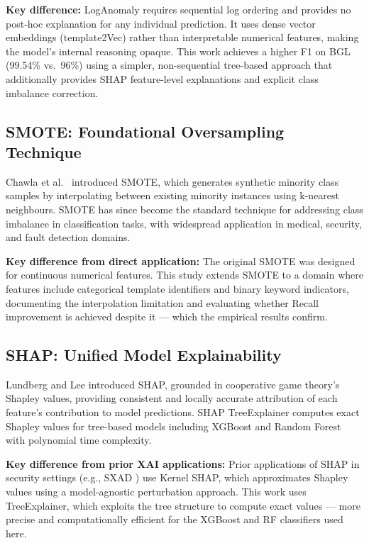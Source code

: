 \documentclass[conference]{IEEEtran}
\begin{document}
\textbf{Key difference:} LogAnomaly requires sequential log ordering and
provides no post-hoc explanation for any individual prediction. It uses
dense vector embeddings (template2Vec) rather than interpretable numerical
features, making the model's internal reasoning opaque. This work achieves
a higher F1 on BGL (99.54\% vs.\ 96\%) using a simpler, non-sequential
tree-based approach that additionally provides SHAP feature-level
explanations and explicit class imbalance correction.

\subsection{SMOTE: Foundational Oversampling Technique}

Chawla et al.\ \cite{chawla2002} introduced SMOTE, which generates synthetic
minority class samples by interpolating between existing minority instances
using k-nearest neighbours. SMOTE has since become the standard technique
for addressing class imbalance in classification tasks, with widespread
application in medical, security, and fault detection domains.

\textbf{Key difference from direct application:} The original SMOTE was
designed for continuous numerical features. This study extends SMOTE to a
domain where features include categorical template identifiers and binary
keyword indicators, documenting the interpolation limitation and evaluating
whether Recall improvement is achieved despite it --- which the empirical
results confirm.

\subsection{SHAP: Unified Model Explainability}

Lundberg and Lee \cite{lundberg2017} introduced SHAP, grounded in cooperative
game theory's Shapley values, providing consistent and locally accurate
attribution of each feature's contribution to model predictions. SHAP
TreeExplainer computes exact Shapley values for tree-based models including
XGBoost and Random Forest with polynomial time complexity.

\textbf{Key difference from prior XAI applications:} Prior applications of
SHAP in security settings (e.g., SXAD \cite{alam2024sxad}) use Kernel SHAP,
which approximates Shapley values using a model-agnostic perturbation
approach. This work uses TreeExplainer, which exploits the tree structure to
compute exact values --- more precise and computationally efficient for the
XGBoost and RF classifiers used here.
\end{document}
